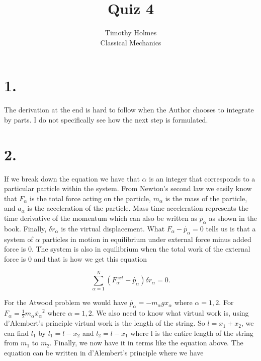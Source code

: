 \documentclass[12pt]{article}
\begin{document}
 
 
\title{Quiz 4}
\author{Timothy Holmes\\ %
Classical Mechanics}

\maketitle

\section*{1.}

The derivation at the end is hard to follow when the Author chooses to integrate by parts. I do not specifically see how the next step is formulated.


\section*{2.}

If we break down the equation we have that $\alpha$ is an integer that corresponds to a particular particle within the system. From Newton's second law we easily know that $F_{\alpha}$ is the total force acting on the particle, $m_{\alpha}$ is the mass of the particle, and $a_{\alpha}$ is the acceleration of the particle. Mass time acceleration represents the time derivative of the momentum which can also be written as $\dot{p_{\alpha}}$ as shown in the book. Finally, $\delta r_{\alpha}$ is the virtual displacement. What $F_{\alpha} - \dot{p_{\alpha}} = 0$ tells us is that a system of $\alpha$ particles in motion in equilibrium under external force minus added force is 0. The system is also in equilibrium when the total work of the external force is 0 and that is how we get this equation 

$$
\sum_{\alpha=1}^{N} (F_{\alpha}^{ext} - \dot{p_{\alpha}}) \delta r_{\alpha}= 0.
$$


For the Atwood problem we would have $\dot{p_{\alpha}} = -m_{\alpha} g x_{\alpha}$ where $\alpha = 1, 2$. For $F_{\alpha} = \frac{1}{2}m_{\alpha} \dot{x_{\alpha}}^{2}$ where $\alpha = 1, 2$. We also need to know what virtual work is, using d'Alembert's principle virtual work is the length of the string. So $l = x_{1} + x_{2}$, we can find $l_{1}$ by  $l_{1} = l - x_{2}$ and $l_{2} = l - x_{1}$ where l is the entire length of the string from $m_{1}$ to $m_{2}$. Finally, we now have it in terms like the equation above. The equation can be written in  d'Alembert's principle where we have 
\end{document}
